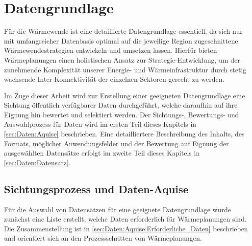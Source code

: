 
\chapter{Datengrundlage}
	
	
	Für die Wärmewende ist eine detaillierte Datengrundlage essentiell, da sich nur mit umfangreicher Datenbasis optimal auf die jeweilige Region zugeschnittene Wärmewendestrategien entwickeln und umsetzen lassen. Hierfür bieten Wärmeplanungen einen holistischen Ansatz zur Strategie-Entwicklung, um der zunehmende Komplexität unserer Energie- und Wärmeinfrastruktur durch stetig wachsende Inter-Konnektivität der einzelnen Sektoren gerecht zu werden.
	
	Im Zuge dieser Arbeit wird zur Erstellung einer geeigneten Datengrundlage eine Sichtung öffentlich verfügbarer Daten durchgeführt, welche daraufhin auf ihre Eignung hin bewertet und selektiert werden. Der Sichtungs-, Bewertungs- und Auswahlprozess für Daten wird im ersten Teil dieses Kapitels in \autoref{sec:Daten:Aquise} beschrieben. Eine detailliertere Beschreibung des Inhalts, des Formats, möglicher Anwendungsfelder und der Bewertung auf Eignung der ausgewählten Datensätze erfolgt im zweite Teil dieses Kapitels in \autoref{sec:Daten:Datensatz}. 
	
	\section{Sichtungsprozess und Daten-Aquise}
	\label{sec:Daten:Aquise}
		Für die Auswahl von Datensätzen für eine geeignete Datengrundlage wurde zunächst eine Liste erstellt, welche Daten erforderlich für Wärmeplanungen sind. Die Zusammenstellung ist in \autoref{sec:Daten:Aquise:Erforderliche_Daten} beschrieben und orientiert sich an den Prozessschritten von Wärmeplanungen. 
		

